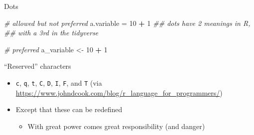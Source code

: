 \documentclass[
  ignorenonframetext,
]{beamer}
\newenvironment{Shaded}{\begin{snugshade}}{\end{snugshade}}
\newcommand{\CommentTok}[1]{\textcolor[rgb]{0.56,0.35,0.01}{\textit{#1}}}
\newcommand{\DecValTok}[1]{\textcolor[rgb]{0.00,0.00,0.81}{#1}}
\newcommand{\NormalTok}[1]{#1}
\newcommand{\OperatorTok}[1]{\textcolor[rgb]{0.81,0.36,0.00}{\textbf{#1}}}
\newcommand{\StringTok}[1]{\textcolor[rgb]{0.31,0.60,0.02}{#1}}
\providecommand{\tightlist}{%
  \setlength{\itemsep}{0pt}\setlength{\parskip}{0pt}}
\begin{document}
\begin{frame}[fragile]{Dots}
\protect\hypertarget{dots}{}

\begin{Shaded}
\begin{Highlighting}[]
\CommentTok{# allowed but not preferred}
\NormalTok{a.variable =}\StringTok{ }\DecValTok{10} \OperatorTok{+}\StringTok{ }\DecValTok{1}
  \CommentTok{## dots have 2 meanings in R, }
    \CommentTok{## with a 3rd in the tidyverse}

\CommentTok{# preferred}
\NormalTok{a_variable <-}\StringTok{ }\DecValTok{10} \OperatorTok{+}\StringTok{ }\DecValTok{1}
\end{Highlighting}
\end{Shaded}

\end{frame}

\begin{frame}[fragile]{``Reserved'' characters}
\protect\hypertarget{reserved-characters}{}

\begin{itemize}
\tightlist
\item
  \texttt{c}, \texttt{q}, \texttt{t}, \texttt{C}, \texttt{D},
  \texttt{I}, \texttt{F}, and \texttt{T} (via
  \url{https://www.johndcook.com/blog/r_language_for_programmers/})
\item
  Except that these can be redefined

  \begin{itemize}
  \tightlist
  \item
    With great power comes great responsibility (and danger)
  \end{itemize}
\end{itemize}

\end{frame}
\end{document}
